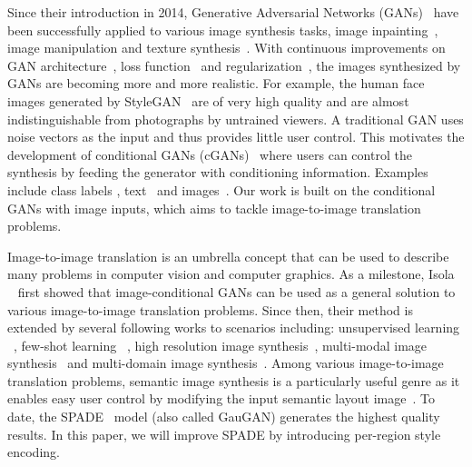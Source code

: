 \documentclass[10pt,twocolumn,letterpaper]{article}
\begin{document}
\vspace*{2mm}
Since their introduction in 2014, Generative Adversarial Networks (GANs)~\cite{goodfellow2014generative} have been successfully applied to various image synthesis tasks, \eg image inpainting~\cite{yu2018generative,demir2018patch}, image manipulation \cite{zhu2016generative,Bau:Ganpaint:2019,abdal2019image2stylegan} and texture synthesis~\cite{TextureSynthesis2016,slossberg2018high,Fr_hst_ck_2019}.
With continuous improvements on GAN architecture~\cite{radford2015unsupervised,karras2018stylebased,park2019SPADE}, loss function~\cite{Mao_2017,arjovsky2017wasserstein} and regularization~\cite{gulrajani2017improved,miyato2018spectral,mescheder2018training}, the images synthesized by GANs are becoming more and more realistic.
For example, the human face images generated by StyleGAN~\cite{karras2018stylebased} are of very high quality and are almost indistinguishable from photographs by untrained viewers.
A traditional GAN uses noise vectors as the input and thus provides little user control. This motivates the development of conditional GANs (cGANs)~\cite{mirza2014conditional} where users can control the synthesis by feeding the generator with conditioning information.
Examples include class labels \cite{miyato2018cgans,mescheder2018training,brock2018large}, text~\cite{reed2016generative,hong2018inferring,xu2018attngan} and images~\cite{isola2016imagetoimage,zhu2017unpaired,liu2017unsupervised,wang2018pix2pixHD,wang2018pix2pixHD,park2019SPADE}.
Our work is built on the conditional GANs with image inputs, which aims to tackle image-to-image translation problems.

\vspace*{2mm}
Image-to-image translation is an umbrella concept that can be used to describe many problems in computer vision and computer graphics.
As a milestone, Isola \etal~\cite{isola2016imagetoimage} first showed that image-conditional GANs can be used as a general solution to various image-to-image translation problems.
Since then, their method is extended by several following works to scenarios including: unsupervised learning ~\cite{zhu2017unpaired,liu2017unsupervised}, few-shot learning ~\cite{liu2019fewshot}, high resolution image synthesis~\cite{wang2018pix2pixHD}, multi-modal image synthesis~\cite{zhu2017toward,huang2018multimodal} and multi-domain image synthesis~\cite{choi2017stargan}.
Among various image-to-image translation problems, semantic image synthesis is a particularly useful genre as it enables easy user control by modifying the input semantic layout image~\cite{CelebAMask-HQ,Bau:Ganpaint:2019,gu2019maskguide,park2019SPADE}.
To date, the SPADE~\cite{park2019SPADE} model (also called GauGAN) generates the highest quality results. In this paper, we will improve SPADE by introducing per-region style encoding.
\end{document}
